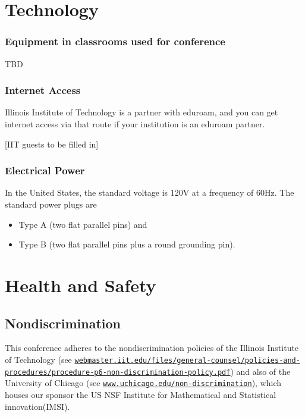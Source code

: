 \section{Technology}

\subsubsection{Equipment in classrooms used for conference}

TBD


\subsubsection{Internet Access}

Illinois Institute of Technology is a partner with eduroam, and you can get internet access via that route if your institution is an eduroam partner.

[IIT guests to be filled in]

\subsubsection{Electrical Power}

In the United States, the standard voltage is 120V at a frequency of 60Hz.  The standard power plugs are
\begin{itemize}
	\item Type A (two flat parallel pins) and
	\item Type B (two flat parallel pins plus a round grounding pin).
\end{itemize}

\section{Health and Safety}

\subsection{Nondiscrimination}
This conference adheres to the nondiscrimination policies of the Illinois Institute of Technology (see \href{https://webmaster.iit.edu/files/general-counsel/policies-and-procedures/procedure-p6-non-discrimination-policy.pdf}{\nolinkurl{webmaster.iit.edu/files/general-counsel/policies-and-procedures/procedure-p6-non-discrimination-policy.pdf}}) and also of the University of Chicago (see \href{https://www.uchicago.edu/non-discrimination}{\nolinkurl{www.uchicago.edu/non-discrimination}}), which houses our sponsor the US NSF Institute for Mathematical and Statistical innovation(IMSI).


